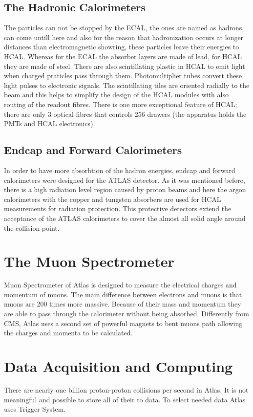 \documentclass[a4paper,9pt]{article}
\begin{document}
\subsection{The Hadronic Calorimeters}
The particles can not be stopped by the ECAL, the ones are named as hadrons, can come untill here
and also for the reason that hadronization occurs at longer distances
than electromagnetic showring, these particles leave their energies to HCAL. Whereas for the ECAL the absorber layers are made of lead, for HCAL they are
made of steel. There are also scintillating plastic in HCAL to emit light when
charged praticles pass through them. Photomultiplier tubes convert these
light pulses to electronic signals. The scintillating tiles are oriented
radially to the beam and this helps to simplify the design of the HCAL
modules with also routing of the readout fibres. There is one more exceptional
feature of HCAL; there are only 3 optical fibres that controls 256 drawers
(the apparatus holds the PMTs and HCAL electronics).

\subsection{Endcap and Forward Calorimeters}
In order to have more absorbtion of the hadron energies, endcap and
forward calorimeters were designed for the ATLAS detector. As it was
mentioned before, there is a high radiation level region caused by proton
beams and here the argon calorimeters with the copper and tungsten absorbers
are used for HCAL measurements for radiation protection. This protective detectors extend the
acceptance of the ATLAS calorimeters to cover the almost all solid
angle around the collision point.

\section{The Muon Spectrometer}
Muon Spectrometer of Atlas is designed to measure the electrical charges and momentum of muons.
The main difference between electrons and muons is that muons are 200 times more massive.
Because of their mass and momentum they are able to pass through the calorimeter without being absorbed.
Differently from CMS, Atlas uses a second set of powerful magnets to bent muons path allowing the charges and momenta to be calculated.
\section{Data Acquisition and Computing}
There are nearly one billion proton-proton collisions per second in Atlas. It is not meaningful and
possible to store all of their to data. To select needed data Atlas uses Trigger System.
\end{document}
